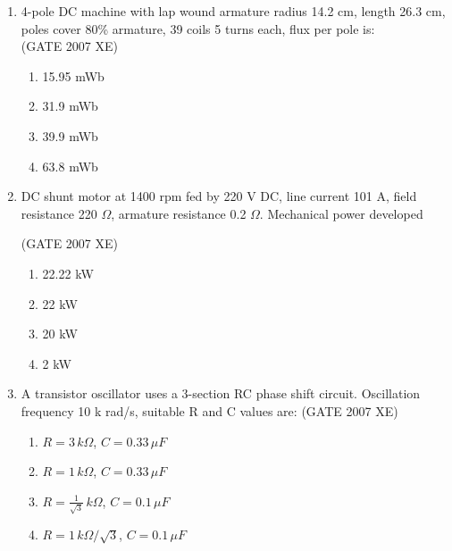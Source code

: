 \documentclass[journal,cmex10]{IEEEtran}
\theoremstyle{remark}
\numberwithin{equation}{enumi}
\numberwithin{figure}{enumi}
\begin{document}
\begin{enumerate}
    \item 4-pole DC machine with lap wound armature radius 14.2 cm, length 26.3 cm, poles cover 80\% armature, 39 coils 5 turns each, flux per pole is:\\
    \hfill{(GATE 2007 XE)}
    \begin{multicols}{4}
    \begin{enumerate}
        \item 15.95 mWb
        \item 31.9 mWb
        \item 39.9 mWb
        \item 63.8 mWb
    \end{enumerate}
\end{multicols}

    \item DC shunt motor at 1400 rpm fed by 220 V DC, line current 101 A, field resistance 220 $\Omega$, armature resistance 0.2 $\Omega$. Mechanical power developed

    \hfill{(GATE 2007 XE)}
    \begin{multicols}{4}
    \begin{enumerate}
        \item 22.22 kW
        \item 22 kW
        \item 20 kW
        \item 2 kW
    \end{enumerate}
\end{multicols}

    \item A transistor oscillator uses a 3-section RC phase shift circuit. Oscillation frequency 10 k rad/s, suitable R and C values are:
    \hfill{(GATE 2007 XE)}
    \begin{multicols}{2}
    \begin{enumerate}
        \item $R=3\,k\Omega$, $C=0.33\,\mu F$
        \item $R=1\,k\Omega$, $C=0.33\,\mu F$
        \item $R=\frac{1}{\sqrt{3}}\,k\Omega$, $C=0.1\,\mu F$
        \item $R=1\,k\Omega/\sqrt{3}$, $C=0.1\,\mu F$
    \end{enumerate}
    \end{multicols}


\end{enumerate}
\end{document}
